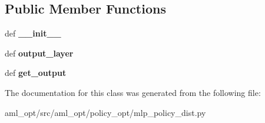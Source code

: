 \subsection*{Public Member Functions}
\begin{DoxyCompactItemize}
\item 
\hypertarget{classaml__opt_1_1policy__opt_1_1mlp__policy__dist_1_1_m_l_p_policy_dist_a67b60b8dd13b230131af5f64d111bc5c}{def {\bfseries \-\_\-\-\_\-init\-\_\-\-\_\-}}\label{classaml__opt_1_1policy__opt_1_1mlp__policy__dist_1_1_m_l_p_policy_dist_a67b60b8dd13b230131af5f64d111bc5c}

\item 
\hypertarget{classaml__opt_1_1policy__opt_1_1mlp__policy__dist_1_1_m_l_p_policy_dist_a3507d7b55ec45c04c8d6976dcbcf0109}{def {\bfseries output\-\_\-layer}}\label{classaml__opt_1_1policy__opt_1_1mlp__policy__dist_1_1_m_l_p_policy_dist_a3507d7b55ec45c04c8d6976dcbcf0109}

\item 
\hypertarget{classaml__opt_1_1policy__opt_1_1mlp__policy__dist_1_1_m_l_p_policy_dist_a00276b173133567845980c0bed5d1cce}{def {\bfseries get\-\_\-output}}\label{classaml__opt_1_1policy__opt_1_1mlp__policy__dist_1_1_m_l_p_policy_dist_a00276b173133567845980c0bed5d1cce}

\end{DoxyCompactItemize}


The documentation for this class was generated from the following file\-:\begin{DoxyCompactItemize}
\item 
aml\-\_\-opt/src/aml\-\_\-opt/policy\-\_\-opt/mlp\-\_\-policy\-\_\-dist.\-py\end{DoxyCompactItemize}
